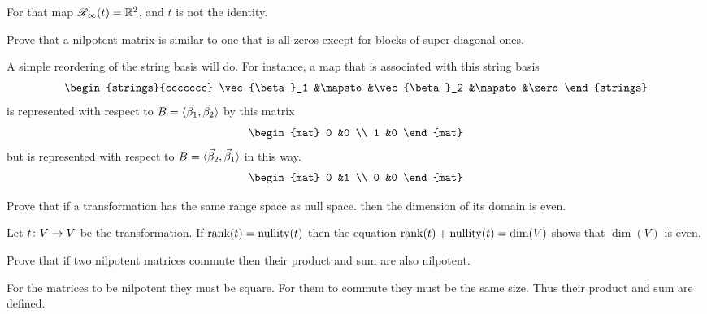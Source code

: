\begin{exercises}
\begin{answer}
\begin{equation*}
      \end{equation*}
      For that map $\mathscr{R}_\infty(t)=\mathbb{R}^2$, and $t$ is not the identity.
    \end{answer}
  \item 
    Prove that a nilpotent matrix is similar to one that is all zeros
    except for blocks of super-diagonal ones.
    \begin{answer}
      A simple reordering of the string basis will do.
      For instance, a map that is associated with this string basis
      \begin{equation*}
         \begin{strings}{ccccccc}
            \vec{\beta}_1 &\mapsto &\vec{\beta}_2 &\mapsto &\zero  
         \end{strings}
      \end{equation*}
      is represented with respect to 
      $B=\langle\vec{\beta}_1,\vec{\beta}_2\rangle$ by this matrix
      \begin{equation*}
        \begin{mat}
          0  &0  \\
          1  &0          
        \end{mat}
      \end{equation*}
      but is represented with respect to 
      $B=\langle\vec{\beta}_2,\vec{\beta}_1\rangle$ in this way.
      \begin{equation*}
        \begin{mat}
          0  &1  \\
          0  &0          
        \end{mat}
      \end{equation*}
    \end{answer}
  \recommended \item
    Prove that if a transformation has the same range space as null space.
    then the dimension of its domain is even.
    \begin{answer}
      Let $\mbox{$t\colon V\to V$}$ be the transformation.
      If \( \operatorname{rank} (t)=\operatorname{nullity} (t) \) then the equation
      \( \operatorname{rank}(t)+\operatorname{nullity}(t)=\dim (V) \) shows that 
      \( \dim (V) \) is even.  
    \end{answer}
  \item 
    Prove that if two nilpotent matrices commute then their product and
    sum are also nilpotent.
    \begin{answer}
      For the matrices to be nilpotent they must be square.
      For them to commute they must be the same size.
      Thus their product and sum are defined.


\end{answer}
\end{exercises}
